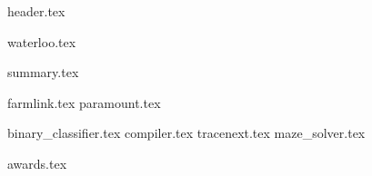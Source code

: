 \documentclass[11pt]{article}
\begin{document}
{header.tex}

{waterloo.tex}

{summary.tex}

{farmlink.tex}
{paramount.tex}

{binary_classifier.tex}
{compiler.tex}
{tracenext.tex}
{maze_solver.tex}

{awards.tex}
\end{document}
